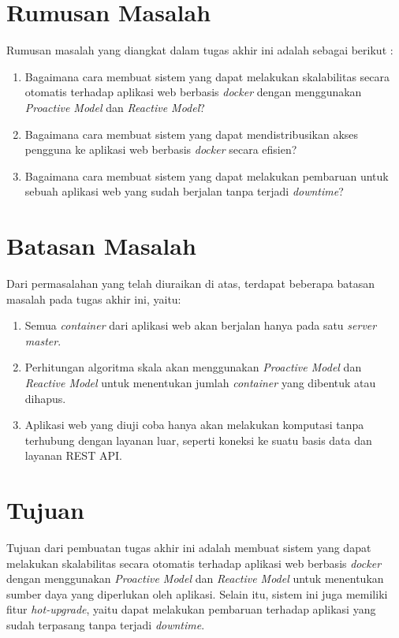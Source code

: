 	\section{Rumusan Masalah}
       	Rumusan masalah yang diangkat dalam tugas akhir ini adalah sebagai berikut :
		\begin{enumerate}
			\item Bagaimana cara membuat sistem yang dapat melakukan skalabilitas secara otomatis terhadap aplikasi web berbasis \textit{docker} dengan menggunakan \textit{Proactive Model} dan \textit{Reactive Model}?
			\item Bagaimana cara membuat sistem yang dapat mendistribusikan akses pengguna ke aplikasi web berbasis \textit{docker} secara efisien?
            \item Bagaimana cara membuat sistem yang dapat melakukan pembaruan untuk sebuah aplikasi web yang sudah berjalan tanpa terjadi \textit{downtime}?
		\end{enumerate}

	\section{Batasan Masalah}
		Dari permasalahan yang telah diuraikan di atas, terdapat beberapa batasan masalah pada tugas akhir ini, yaitu:
		\begin{enumerate}
			\item Semua \textit{container} dari aplikasi web akan berjalan hanya pada satu \textit{server master}.
            \item Perhitungan algoritma skala akan menggunakan \textit{Proactive Model} dan \textit{Reactive Model} untuk menentukan jumlah \textit{container} yang dibentuk atau dihapus.
            \item Aplikasi web yang diuji coba hanya akan melakukan komputasi tanpa terhubung dengan layanan luar, seperti koneksi ke suatu basis data dan layanan REST API.
		\end{enumerate}

	\section{Tujuan}
       	Tujuan dari pembuatan tugas akhir ini adalah membuat sistem yang dapat melakukan skalabilitas secara otomatis terhadap aplikasi web berbasis \textit{docker} dengan menggunakan \textit{Proactive Model} dan \textit{Reactive Model} untuk menentukan sumber daya yang diperlukan oleh aplikasi. Selain itu, sistem ini juga memiliki fitur \textit{hot-upgrade}, yaitu dapat melakukan pembaruan terhadap aplikasi yang sudah terpasang tanpa terjadi \textit{downtime}.
        
